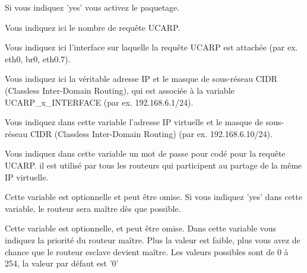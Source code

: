 \begin{description}


Si vous indiquez 'yes' vous activez le paquetage.


Vous indiquez ici le nombre de requête UCARP.


Vous indiquez ici l'interface sur laquelle la requête UCARP est attachée
(par ex. eth0, br0, eth0.7).


Vous indiquez ici la véritable adresse IP et le masque de sous-réseau CIDR
(Classless Inter-Domain Routing), qui est associée à la variable
UCARP\_x\_INTERFACE (par ex. 192.168.6.1/24).


Vous indiquez dans cette variable l'adresse IP virtuelle et le masque de
sous-réseau CIDR (Classless Inter-Domain Routing) (par ex. 192.168.6.10/24).


Vous indiquez dans cette variable un mot de passe pour codé pour la requête
UCARP. il est utilisé par tous les routeurs qui participent au partage de
la même IP virtuelle.


Cette variable est optionnelle et peut être omise. Si vous indiquez 'yes'
dans cette variable, le routeur sera maître dès que possible.


Cette variable est optionnelle, et peut être omise. Dans cette variable
vous indiquez la priorité du routeur maître. Plus la valeur est faible, plus
vous avez de chance que le routeur esclave devient maître. Les valeurs possibles
sont de 0 à 254, la valeur par défaut est '0'

\end{description}
